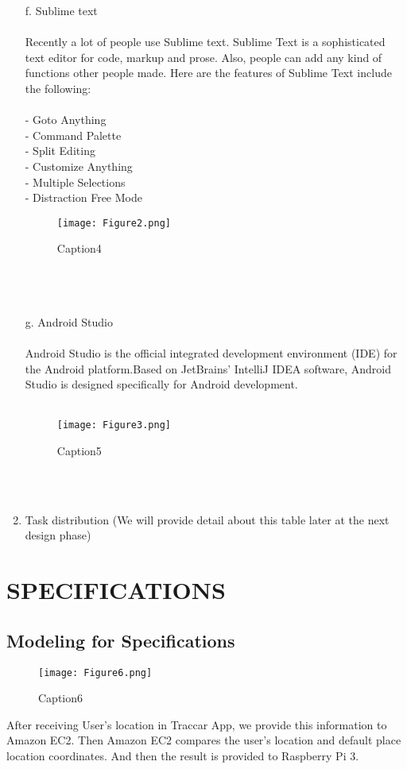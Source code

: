 \documentclass[10pt,a4paper,twocolumn]{report}
\begin{document}
\begin{enumerate}
		f.	Sublime text \\ \\
		Recently a lot of people use Sublime text. Sublime Text is a sophisticated text editor for code, markup and prose. Also, people can add any kind of functions other people made. Here are the features of Sublime Text include the following:  \\ \\
		
		 - Goto Anything \\
		 - Command Palette \\
		 - Split Editing \\
		 - Customize Anything \\
		 - Multiple Selections \\
		 - Distraction Free Mode \\
			\begin{figure}[h]
				\centering
				\texttt{[image: Figure2.png]}
				\caption{Caption4}
				\label{fig4}
			\end{figure} \\ \\\\

       g.	Android Studio  \\ \\		 

       Android Studio is the official integrated development environment (IDE) for the Android platform.Based on JetBrains' IntelliJ IDEA software, Android Studio is designed specifically for Android development. \\ \\
       \begin{figure}[h]
				\texttt{[image: Figure3.png]}
				\caption{Caption5}
				\label{fig5}
		\end{figure} \\\\
		\item Task distribution (We will provide detail about this table later at the next design phase) \\
		 \end{enumerate}
		 
\section{SPECIFICATIONS}
	\subsection{Modeling for Specifications}
	 	\begin{figure}[h]
				\texttt{[image: Figure6.png]}
				\caption{Caption6}
				\label{fig6}
		\end{figure}
		After receiving User’s location in Traccar App, we provide this information to Amazon EC2. Then Amazon EC2 compares the user’s location and default place location coordinates. And then the result is provided to Raspberry Pi 3. \\ 
		 
\end{document}
